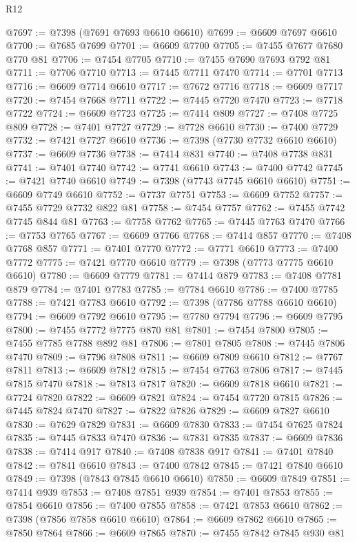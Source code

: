 \begin{lexlean}{R12}
\begin{coremodule}
@7697 := @7398 (@7691 @7693 @6610 @6610)
@7699 := @6609 @7697 @6610
@7700 := @7685 @7699
@7701 := @6609 @7700
@7705 := @7455 @7677 @7680 @770 @81
@7706 := @7454 @7705
@7710 := @7455 @7690 @7693 @792 @81
@7711 := @7706 @7710
@7713 := @7445 @7711 @7470
@7714 := @7701 @7713
@7716 := @6609 @7714 @6610
@7717 := @7672 @7716
@7718 := @6609 @7717
@7720 := @7454 @7668 @7711
@7722 := @7445 @7720 @7470
@7723 := @7718 @7722
@7724 := @6609 @7723
@7725 := @7414 @809
@7727 := @7408 @7725 @809
@7728 := @7401 @7727
@7729 := @7728 @6610
@7730 := @7400 @7729
@7732 := @7421 @7727 @6610
@7736 := @7398 (@7730 @7732 @6610 @6610)
@7737 := @6609 @7736
@7738 := @7414 @831
@7740 := @7408 @7738 @831
@7741 := @7401 @7740
@7742 := @7741 @6610
@7743 := @7400 @7742
@7745 := @7421 @7740 @6610
@7749 := @7398 (@7743 @7745 @6610 @6610)
@7751 := @6609 @7749 @6610
@7752 := @7737 @7751
@7753 := @6609 @7752
@7757 := @7455 @7729 @7732 @822 @81
@7758 := @7454 @7757
@7762 := @7455 @7742 @7745 @844 @81
@7763 := @7758 @7762
@7765 := @7445 @7763 @7470
@7766 := @7753 @7765
@7767 := @6609 @7766
@7768 := @7414 @857
@7770 := @7408 @7768 @857
@7771 := @7401 @7770
@7772 := @7771 @6610
@7773 := @7400 @7772
@7775 := @7421 @7770 @6610
@7779 := @7398 (@7773 @7775 @6610 @6610)
@7780 := @6609 @7779
@7781 := @7414 @879
@7783 := @7408 @7781 @879
@7784 := @7401 @7783
@7785 := @7784 @6610
@7786 := @7400 @7785
@7788 := @7421 @7783 @6610
@7792 := @7398 (@7786 @7788 @6610 @6610)
@7794 := @6609 @7792 @6610
@7795 := @7780 @7794
@7796 := @6609 @7795
@7800 := @7455 @7772 @7775 @870 @81
@7801 := @7454 @7800
@7805 := @7455 @7785 @7788 @892 @81
@7806 := @7801 @7805
@7808 := @7445 @7806 @7470
@7809 := @7796 @7808
@7811 := @6609 @7809 @6610
@7812 := @7767 @7811
@7813 := @6609 @7812
@7815 := @7454 @7763 @7806
@7817 := @7445 @7815 @7470
@7818 := @7813 @7817
@7820 := @6609 @7818 @6610
@7821 := @7724 @7820
@7822 := @6609 @7821
@7824 := @7454 @7720 @7815
@7826 := @7445 @7824 @7470
@7827 := @7822 @7826
@7829 := @6609 @7827 @6610
@7830 := @7629 @7829
@7831 := @6609 @7830
@7833 := @7454 @7625 @7824
@7835 := @7445 @7833 @7470
@7836 := @7831 @7835
@7837 := @6609 @7836
@7838 := @7414 @917
@7840 := @7408 @7838 @917
@7841 := @7401 @7840
@7842 := @7841 @6610
@7843 := @7400 @7842
@7845 := @7421 @7840 @6610
@7849 := @7398 (@7843 @7845 @6610 @6610)
@7850 := @6609 @7849
@7851 := @7414 @939
@7853 := @7408 @7851 @939
@7854 := @7401 @7853
@7855 := @7854 @6610
@7856 := @7400 @7855
@7858 := @7421 @7853 @6610
@7862 := @7398 (@7856 @7858 @6610 @6610)
@7864 := @6609 @7862 @6610
@7865 := @7850 @7864
@7866 := @6609 @7865
@7870 := @7455 @7842 @7845 @930 @81

\end{coremodule}
\end{lexlean}
